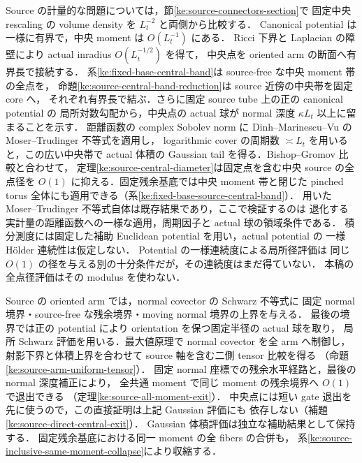 Source の計量的な問題については，節\ref{ke:source-connectors-section}で
固定中央 rescaling の volume density を $L_t^{-2}$ と両側から比較する．
Canonical potential は一様に有界で，中央 moment は $O(L_t^{-1})$ にある．
Ricci 下界と Laplacian の障壁により actual inradius $O(L_t^{-1/2})$ を得て，
中央点を oriented arm の断面へ有界長で接続する．
系\ref{ke:fixed-base-central-band}は source-free な中央 moment 帯の全点を，
命題\ref{ke:source-central-band-reduction}は source 近傍の中央帯を固定 core へ，
それぞれ有界長で結ぶ．さらに固定 source tube 上の正の canonical potential の
局所対数勾配から，中央点の actual 球が normal 深度 $\kappa L_t$ 以上に留まることを示す．
距離函数の complex Sobolev norm に Dinh--Marinescu--Vu の
Moser--Trudinger 不等式\cite[Theorem~1.2]{DMVMT}を適用し，
logarithmic cover の周期数 $\asymp L_t$ を用いると，この広い中央帯で
actual 体積の Gaussian tail を得る．Bishop--Gromov 比較と合わせて，
定理\ref{ke:source-central-diameter}は固定点を含む中央 source の全点径を
$O(1)$ に抑える．固定残余基底では中央 moment 帯と閉じた pinched torus
全体にも適用できる（系\ref{ke:fixed-base-source-central-band}）．
用いた Moser--Trudinger 不等式自体は既存結果であり，ここで検証するのは
退化する実計量の距離函数への一様な適用，周期因子と actual 球の領域条件である．
積分測度には固定した補助 Euclidean potential を用い，actual potential の
一様 Hölder 連続性は仮定しない．
Potential の一様連続度による局所径評価\cite[Proposition~1.4]{GGZDiameter}は
同じ $O(1)$ の径を与える別の十分条件だが，その連続度はまだ得ていない．
本稿の全点径評価はその modulus を使わない．

Source の oriented arm では，normal covector の Schwarz 不等式に
固定 normal 境界・source-free な残余境界・moving normal 境界の上界を与える．
最後の境界では正の potential により orientation を保つ固定半径の actual 球を取り，
局所 Schwarz 評価を用いる．最大値原理で normal covector を全 arm へ制御し，
射影下界と体積上界を合わせて source 軸を含む二側 tensor 比較を得る
（命題\ref{ke:source-arm-uniform-tensor}）．
固定 normal 座標での残余水平経路と，最後の normal 深度補正により，
全共通 moment で同じ moment の残余境界へ $O(1)$ で退出できる
（定理\ref{ke:source-all-moment-exit}）．
中央点には短い gate 退出を先に使うので，この直接証明は上記 Gaussian 評価にも
依存しない（補題\ref{ke:source-direct-central-exit}）．
Gaussian 体積評価は独立な補助結果として保持する．
固定残余基底における同一 moment の全 fibers の合併も，
系\ref{ke:source-inclusive-same-moment-collapse}により収縮する．

